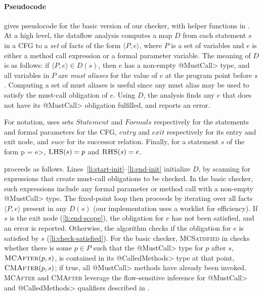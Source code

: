 \paragraph{Pseudocode}  gives pseudocode for the
basic version of our checker, with helper functions in .  At a
high level, the dataflow analysis computes a map $D$ from each statement $s$ in
a CFG to a \emph{set} of facts of the form $\langle P, e \rangle$, where $P$ is
a set of variables and $e$ is either a method call expression or a formal
parameter variable.  The meaning of $D$ is as follows: if $\langle P, e \rangle
\in D(s)$, then $e$ has a non-empty \<@MustCall> type, and all variables in $P$
are \emph{must aliases} for the value of $e$ at the program point before $s$.
Computing a set of must aliases is useful since any must alias may be used to
satisfy the must-call obligation of $e$.  Using $D$, the analysis finds any $e$
that does not have its \<@MustCall> obligation fulfilled, and reports an error.

For notation,  uses sets $\mathit{Statement}$ and
$\mathit{Formals}$ respectively for the statements and formal parameters for the
CFG, $\mathit{entry}$ and $\mathit{exit}$ respectively for its entry and exit
node, and $\mathit{succ}$ for its successor relation.  Finally, for a statement
$s$ of the form \<p = e>, $\textsc{LHS}(s) = p$ and $\textsc{RHS}(s) = e$.   

 proceeds as follows.
Lines~\ref{li:start-init}--\ref{li:end-init} initialize $D$, by scanning for
expressions that create must-call obligations to be checked.  
In the basic checker, such expressions include any formal parameter or method
call with a non-empty \<@MustCall> type.  The fixed-point loop then proceeds by
iterating over all facts $\langle P, e \rangle$ present in any $D(s)$ (our
implementation uses a worklist for efficiency).  If $s$ is the exit node
(\cref{li:end-scope}), the obligation for $e$ has not been satisfied, and an
error is reported.  Otherwise, the algorithm checks if the obligation for $e$ is
satisfied by $s$ (\cref{li:check-satisfied}).  For the basic checker, \textsc{MCSatisfied} in
 checks whether there is some $p \in P$ such that
the \<@MustCall> type for $p$ after $s$, $\textsc{MCAfter}(p,s)$, is
contained in its \<@CalledMethods> type at that point, $\textsc{CMAfter}(p,s)$;
if true, all \<@MustCall> methods have already been invoked.  \textsc{MCAfter}
and \textsc{CMAfter} leverage the flow-sensitive inference for \<@MustCall> and
\<@CalledMethods> qualifiers described in .
 

